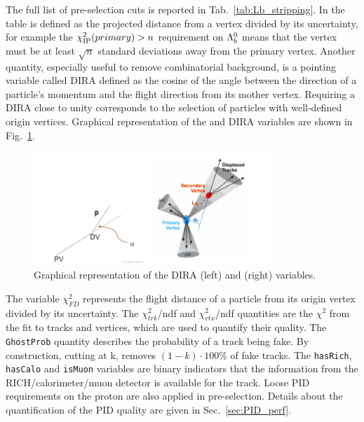 The full list of pre-selection cuts is reported in Tab.~\ref{tab:Lb_stripping}.
In the table \chisqip is defined as the projected distance from a vertex
divided by its uncertainty, for example the $\chi^2_{\rm IP}(primary) > n$ requirement on ${{\Lambda}^0_{b}}$ means
that the \Lb vertex must be at least $\sqrt{n}$ standard deviations away from the primary vertex.
Another quantity, especially useful to remove combinatorial background, is a pointing variable called DIRA
defined as the cosine of the angle between the direction of a particle's momentum and
the flight direction from its mother vertex. Requiring a DIRA close to unity corresponds to 
the selection of particles with well-defined origin vertices.
Graphical representation of the \chisqip and DIRA variables are shown in Fig.~\ref{fig:IPandDIRA}.
%
\begin{figure}[hb]
\centering
\includegraphics[width=0.8\textwidth]{Lmumu/figs/IPandDIRA.png}
\caption{Graphical representation of the DIRA (left) and \chisqip (right) variables.}
\label{fig:IPandDIRA}
\end{figure}
%
The variable $\chi^2_{FD}$ represents the flight distance of a particle from its origin vertex
divided by its uncertainty. The $\chi^2_{trk}$/ndf and $\chi^2_{vtx}$/ndf quantities are the $\chi^2$ 
from the fit to tracks and vertices, which are used to quantify their quality.
The \verb!GhostProb! quantity describes the probability of a track being fake.
By construction, cutting at k, removes $(1 - k)\cdot 100 \%$ of fake tracks.
The \verb!hasRich!, \verb!hasCalo! and \verb!isMuon! variables are binary indicators that
the information from the RICH/calorimeter/muon detector is available for the track.
Loose PID requirements on the proton are also applied in pre-selection.
Details about the quantification of the PID quality are given in Sec.~\ref{sec:PID_perf}.
